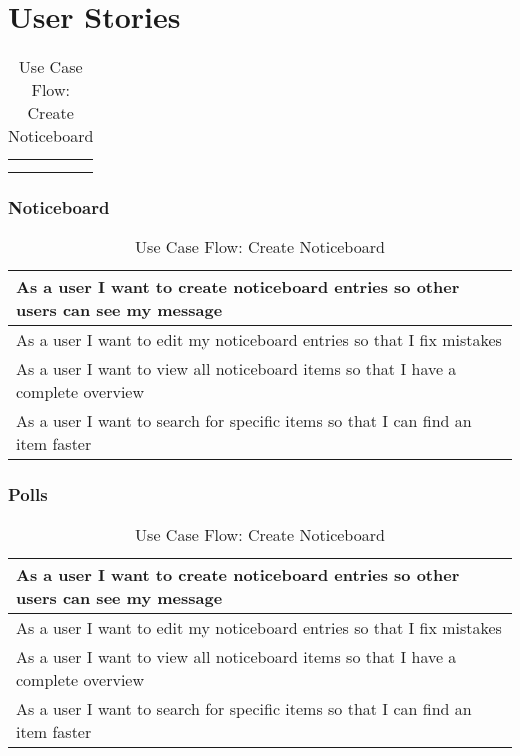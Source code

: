 \chapter{User Stories}
\begin{table}[H]
    \begin{tabularx}{\linewidth}{|X|}
      \hline
        \\
       \hline
        \\
       \hline
        \\
       \hline 
    \end{tabularx}
    \caption{Use Case Flow: Create Noticeboard}
  \end{table}

\subsection{Noticeboard}
\begin{table}[H]
    \begin{tabularx}{\linewidth}{|X|}
      \hline
        As a user I want to create noticeboard entries so other users can see my message \\
       \hline
        As a user I want to edit my noticeboard entries so that I fix mistakes \\
       \hline
        As a user I want to view all noticeboard items so that I have a complete overview \\
       \hline
        As a user I want to search for specific items so that I can find an item faster \\
       \hline 
    \end{tabularx}
    \caption{Use Case Flow: Create Noticeboard}
  \end{table}

\subsection{Polls}
\begin{table}[H]
  \begin{tabularx}{\linewidth}{|X|}
    \hline
      As a user I want to create noticeboard entries so other users can see my message \\
     \hline
      As a user I want to edit my noticeboard entries so that I fix mistakes \\
     \hline
      As a user I want to view all noticeboard items so that I have a complete overview \\
     \hline
      As a user I want to search for specific items so that I can find an item faster \\
     \hline 
  \end{tabularx}
  \caption{Use Case Flow: Create Noticeboard}
\end{table}

